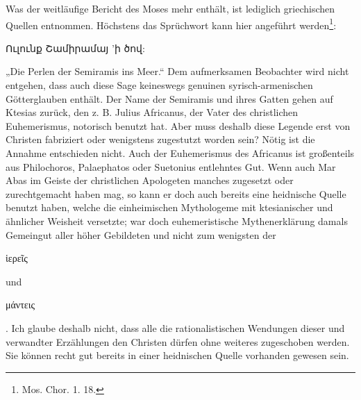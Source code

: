 \documentclass{article}
\begin{document}
Was der weitläufige Bericht des Moses mehr enthält, ist lediglich griechischen Quellen entnommen. Höchstens das Sprüchwort kann hier angeführt werden\footnote{Mos. Chor. 1. 18.}: \begin{armenian}Ուլունք Շամիրամայ 'ի ծով:\end{armenian} „Die Perlen der Semiramis ins Meer.“ Dem aufmerksamen Beobachter wird nicht entgehen, dass auch diese Sage keineswegs genuinen syrisch-armenischen Götterglauben enthält. Der Name der Semiramis und ihres Gatten gehen auf Ktesias zurück, den z. B. Julius Africanus, der Vater des christlichen Euhemerismus, notorisch benutzt hat. Aber muss deshalb diese Legende erst von Christen fabriziert oder wenigstens zugestutzt worden sein? Nötig ist die Annahme entschieden nicht. Auch der Euhemerismus des Africanus ist großenteils aus Philochoros, Palaephatos oder Suetonius entlehntes Gut. Wenn auch Mar Abas im Geiste der christlichen Apologeten manches zugesetzt oder zurechtgemacht haben mag, so kann er doch auch bereits eine heidnische Quelle benutzt haben, welche die einheimischen Mythologeme mit ktesianischer und ähnlicher Weisheit versetzte; war doch euhemeristische Mythenerklärung damals Gemeingut aller höher Gebildeten und nicht zum wenigsten der \begin{greek}ἱερεῖς\end{greek} und \begin{greek}μάντεις\end{greek}. Ich glaube deshalb nicht, dass alle die rationalistischen Wendungen dieser und verwandter Erzählungen den Christen dürfen ohne weiteres zugeschoben werden. Sie können recht gut bereits in einer heidnischen Quelle vorhanden gewesen sein.
\end{document}
